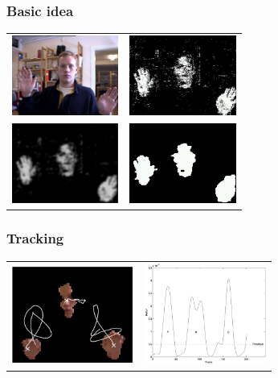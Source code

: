 \documentclass[10pt]{beamer}
\begin{document}
\begin{frame}
  \frametitle{Basic idea}
  \begin{center}
    \begin{tabular}[c]{cc}
      \includegraphics[width=3.5cm]{fredrik-original} &
      \includegraphics[width=3.5cm]{skin-pixels} \\
      \includegraphics[width=3.5cm]{skin-density} &
      \includegraphics[width=3.5cm]{skin-components}
    \end{tabular}
  \end{center}
\end{frame}

\begin{frame}
  \frametitle{Tracking}
  \begin{center}
    \begin{tabular}[c]{cc}
      \includegraphics[width=4cm]{gesture-tracking} &
      \includegraphics[width=4cm]{gesture-motion}
    \end{tabular}
  \end{center}
\end{frame}
\end{document}
